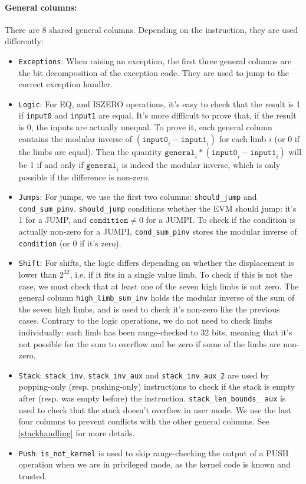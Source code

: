 \paragraph*{General columns:} There are 8 shared general columns. Depending on the instruction, they are used differently:
\begin{itemize}
    \item  \texttt{Exceptions}: When raising an exception, the first three general columns are the bit decomposition of the exception code.
They are used to jump to the correct exception handler.
    \item  \texttt{Logic}: For EQ, and ISZERO operations, it's easy to check that the result is 1 if \texttt{input0} and \texttt{input1} are equal. It's more difficult
to prove that, if the result is 0, the inputs are actually unequal. To prove it, each general column contains the modular inverse of $(\texttt{input0}_i - \texttt{input1}_i)$
for each limb $i$ (or 0 if the limbs are equal). Then the quantity $\texttt{general}_i * (\texttt{input0}_i - \texttt{input1}_i)$ will be 1 if and only if $\texttt{general}_i$ is
indeed the modular inverse, which is only possible if the difference is non-zero.
    \item  \texttt{Jumps}: For jumps, we use the first two columns: \texttt{should\_jump} and \texttt{cond\_sum\_pinv}. \texttt{should\_jump} conditions whether the EVM should jump: it's
1 for a JUMP, and $\texttt{condition} \neq 0$ for a JUMPI. To check if the condition is actually non-zero for a JUMPI, \texttt{cond\_sum\_pinv} stores the modular inverse of
\texttt{condition} (or 0 if it's zero).
    \item  \texttt{Shift}: For shifts, the logic differs depending on whether the displacement is lower than $2^{32}$, i.e. if it fits in a single value limb.
To check if this is not the case, we must check that at least one of the seven high limbs is not zero. The general column \texttt{high\_limb\_sum\_inv} holds the modular inverse
of the sum of the seven high limbs, and is used to check it's non-zero like the previous cases.
Contrary to the logic operations, we do not need to check limbs individually: each limb has been range-checked to 32 bits, meaning that it's not possible for the sum to
overflow and be zero if some of the limbs are non-zero.
    \item  \texttt{Stack}: \texttt{stack\_inv}, \texttt{stack\_inv\_aux} and \texttt{stack\_inv\_aux\_2} are used by popping-only (resp. pushing-only) instructions to check if the stack is empty after (resp. was empty
before) the instruction. \texttt{stack\_len\_bounds\_ aux} is used to check that the stack doesn't overflow in user mode. We use the last four columns to prevent conflicts with the other general columns.
See \ref{stackhandling} for more details.
    \label{push_general_view}
    \item  \texttt{Push}: \texttt{is\_not\_kernel} is used to skip range-checking the output of a PUSH operation when we are in privileged mode, as the kernel code is known and trusted.
\end{itemize}
